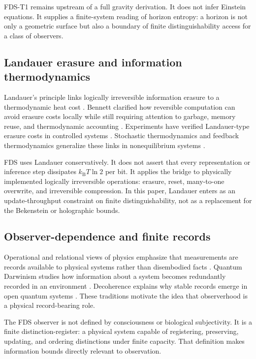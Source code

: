 \documentclass[10pt,a4paper,twocolumn,aps,prl]{revtex4-2}
\newcommand{\kB}{k_{\mathrm B}}
\begin{document}
FDS-T1 remains upstream of a full gravity derivation. It does not infer Einstein equations. It supplies a finite-system reading of horizon entropy: a horizon is not only a geometric surface but also a boundary of finite distinguishability access for a class of observers.

\subsection{Landauer erasure and information thermodynamics}

Landauer's principle links logically irreversible information erasure to a thermodynamic heat cost \cite{landauer1961}. Bennett clarified how reversible computation can avoid erasure costs locally while still requiring attention to garbage, memory reuse, and thermodynamic accounting \cite{bennett1982}. Experiments have verified Landauer-type erasure costs in controlled systems \cite{berut2012,jun2014,hong2016}. Stochastic thermodynamics and feedback thermodynamics generalize these links in nonequilibrium systems \cite{seifert2012,parrondo2015,sagawa2010}.

FDS uses Landauer conservatively. It does not assert that every representation or inference step dissipates $\kB T\ln2$ per bit. It applies the bridge to physically implemented logically irreversible operations: erasure, reset, many-to-one overwrite, and irreversible compression. In this paper, Landauer enters as an update-throughput constraint on finite distinguishability, not as a replacement for the Bekenstein or holographic bounds.

\subsection{Observer-dependence and finite records}

Operational and relational views of physics emphasize that measurements are records available to physical systems rather than disembodied facts \cite{wheeler1990,rovelli1996}. Quantum Darwinism studies how information about a system becomes redundantly recorded in an environment \cite{zurek2003}. Decoherence explains why stable records emerge in open quantum systems \cite{zurek2003,schlosshauer2007}. These traditions motivate the idea that observerhood is a physical record-bearing role.

The FDS observer is not defined by consciousness or biological subjectivity. It is a finite distinction-register: a physical system capable of registering, preserving, updating, and ordering distinctions under finite capacity. That definition makes information bounds directly relevant to observation.
\end{document}
